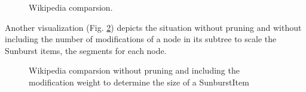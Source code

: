 \begin{figure}[tb]
\caption{\label{fig:wikivis} Wikipedia comparsion.}
\end{figure}

Another visualization (Fig. \ref{fig:wikivis-without-modscale}) depicts the situation without pruning and without including the number of modifications of a node in its subtree to scale the Sunburst items, the segments for each node.

\begin{figure}[tb]
\caption{\label{fig:wikivis-without-modscale} Wikipedia comparsion without pruning and including the modification weight to determine the size of a SunburstItem}
\end{figure}

